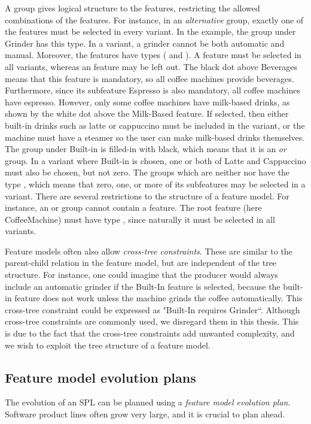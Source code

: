 A group gives logical structure to the features, restricting the allowed combinations of the features. For instance, in an \emph{alternative} group, exactly one of the features must be selected in every variant. In the example, the group under Grinder has this type. In a variant, a grinder cannot be both automatic and manual. Moreover, the features have types (\optional{} and \mandatory{}). A \mandatory{} feature must be selected in all variants, whereas an \optional{} feature may be left out. The black dot above Beverages means that this feature is mandatory, so all coffee machines provide beverages. Furthermore, since its subfeature Espresso is also mandatory, all coffee machines have espresso. However, only some coffee machines have milk-based drinks, as shown by the white dot above the Milk-Based feature. If selected, then either built-in drinks such as latte or cappuccino must be included in the variant, or the machine must have a steamer so the user can make milk-based drinks themselves. The group under Built-in is filled-in with black, which means that it is an \emph{or} group. In a variant where Built-in is chosen, one or both of Latte and Cappuccino must also be chosen, but not zero. The groups which are neither \xortype{} nor \ortype{} have the type \andtype{}, which means that zero, one, or more of its subfeatures may be selected in a variant. There are several restrictions to the structure of a feature model. For instance, an \xortype{} or \ortype{} group cannot contain a \mandatory{} feature. The root feature (here CoffeeMachine) must have type \mandatory{}, since naturally it must be selected in all variants.

Feature models often also allow \emph{cross-tree constraints}. These are similar to the parent-child relation in the feature model, but are independent of the tree structure. For instance, one could imagine that the producer would always include an automatic grinder if the Built-In feature is selected, because the built-in feature does not work unless the machine grinds the coffee automatically. This cross-tree constraint could be expressed as "Built-In requires Grinder``. Although cross-tree constraints are commonly used, we disregard them in this thesis. This is due to the fact that the cross-tree constraints add unwanted complexity, and we wish to exploit the tree structure of a feature model.

\subsection{Feature model evolution plans}
\label{sub:feature-model-evolution-plans}
The evolution of an SPL can be planned using a \emph{feature model evolution plan}. Software product lines often grow very large, and it is crucial to plan ahead.


